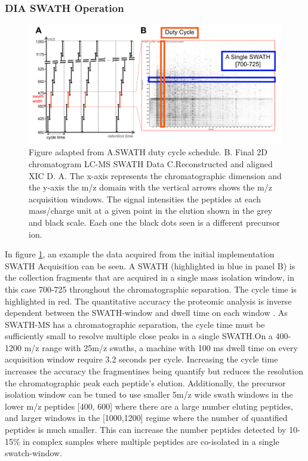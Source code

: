 \documentclass[a4paper,11pt,twoside]{book}
\begin{document}
	\subsubsection{DIA SWATH Operation}
	\begin{figure}[t!]
		\centering
		\includegraphics[width=1.0\linewidth]{3.Proteomics/DIA_SWATH_Principle_1.pdf}
		\caption{Figure adapted from \citep{Rost2014OpenSWATHData} A.SWATH duty cycle schedule. B. Final 2D chromatogram LC-MS SWATH Data C.Reconstructed and aligned XIC D.  A. The x-axis represents the chromatographic dimension and the y-axis the m/z domain with the vertical arrows shows the m/z acquisition windows. The signal intensities the peptides at each mass/charge unit at a given point in the elution shown in the grey and black scale. Each one the black dots seen is  a different precursor ion.}
		\label{Deconvoluted MS2 Spectra}
	\end{figure}
	
	In figure \ref{Deconvoluted MS2 Spectra}, an example the data acquired from the initial implementation SWATH Acquisition can be seen. A SWATH (highlighted in blue in panel B) is the collection fragments that  are acquired in a single mass isolation window, in this case 700-725 throughout the chromatographic separation. The cycle time is highlighted in red. The quantitative accuracy the proteomic analysis is inverse dependent between the SWATH-window and dwell time on each window \citep{rost2017automated}. As SWATH-MS has a chromatographic separation, the cycle time must be sufficiently small to resolve multiple close peaks in a single SWATH.On a 400-1200 m/z range with 25m/z swaths, a machine with 100 ms dwell time on every acquisition window require 3.2 seconds per cycle. Increasing the cycle time increases the accuracy the fragmentines being quantify but reduces the resolution the chromatographic peak each peptide's elution\citep{Lange2008SelectedTutorial.}. Additionally, the precursor isolation window can be tuned to use smaller 5m/z wide swath windows in the lower m/z peptides [400, 600] where there are a large number eluting peptides, and larger windows in the [1000,1200] regime where the number of quantified peptides is much smaller. This can increase the number peptides detected by 10-15\% in complex samples where multiple peptides are co-isolated in a single swatch-window.
	
\end{document}
